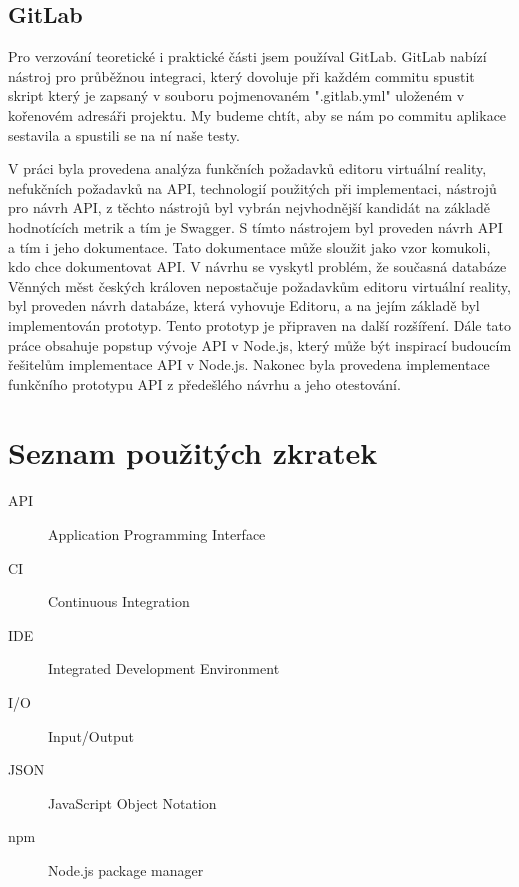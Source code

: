 \documentclass[thesis=B,czech]{FITthesis}[2012/06/26]
\begin{document}
    \section{GitLab}
        Pro verzování teoretické i praktické části jsem používal GitLab. GitLab nabízí nástroj pro průběžnou integraci, který dovoluje při každém commitu spustit skript který je zapsaný v souboru pojmenovaném ".gitlab.yml" uloženém v kořenovém adresáři projektu. My budeme chtít, aby se nám po commitu aplikace sestavila a spustili se na ní naše testy.
    

\begin{conclusion}
    V práci byla provedena analýza funkčních požadavků editoru virtuální reality, nefukčních požadavků na API, technologií použitých při implementaci, nástrojů pro návrh API, z těchto nástrojů byl vybrán nejvhodnější kandidát na základě hodnotících metrik a tím je Swagger. S tímto nástrojem byl proveden návrh API a tím i jeho dokumentace. Tato dokumentace může sloužit jako vzor komukoli, kdo chce dokumentovat API.
    V návrhu se vyskytl problém, že současná databáze Věnných měst českých královen nepostačuje požadavkům editoru virtuální reality, byl proveden návrh databáze, která vyhovuje Editoru, a na jejím základě byl implementován prototyp. Tento prototyp je připraven na další rozšíření.
    Dále tato práce obsahuje popstup vývoje API v Node.js, který může být inspirací budoucím řešitelům implementace API v Node.js.
    Nakonec byla provedena implementace funkčního prototypu API z předešlého návrhu a jeho otestování.

\end{conclusion}




\appendix

\chapter{Seznam použitých zkratek}
\begin{description}
	\item[API] Application Programming Interface
	\item[CI] Continuous Integration
	\item[IDE] Integrated Development Environment
	\item[I/O] Input/Output
	\item[JSON] JavaScript Object Notation
	\item[npm] Node.js package manager
\end{description}
\end{document}
